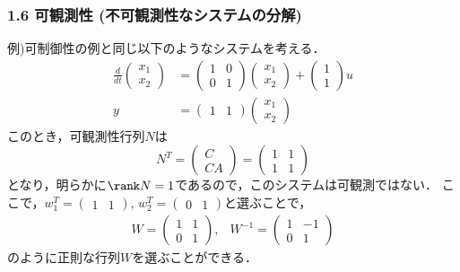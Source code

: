 \begin{frame}[t]
\frametitle{1.6 可観測性 (不可観測性なシステムの分解)}
例)可制御性の例と同じ以下のようなシステムを考える．
\begin{align}
 \frac{d}{dt}
  \left(
   \begin{array}{c}
    x_1 \\
    x_2
   \end{array}
  \right) &=
  \left(
   \begin{array}{cc}
    1 & 0 \\
    0 & 1
   \end{array}
  \right)
  \left(
   \begin{array}{c}
    x_1 \\
    x_2
   \end{array}
  \right) +
  \left(
   \begin{array}{c}
    1 \\
    1
   \end{array}
  \right) u \\
 y &=
  \left(
   \begin{array}{cc}
    1 & 1
   \end{array}
  \right)
  \left(
   \begin{array}{c}
    x_1 \\
    x_2
   \end{array}
  \right)
\end{align}
このとき，可観測性行列$N$は
\begin{equation}
 N^T =
  \left(
   \begin{array}{c}
    C \\
    CA
   \end{array}
  \right) =
  \left(
   \begin{array}{cc}
    1 & 1 \\
    1 & 1
   \end{array}
  \right)
\end{equation}
となり，明らかに$\rank N = 1$であるので，このシステムは可観測ではない．
ここで，$w_1^T = (\begin{array}{cc}1 & 1\end{array})$,
$w_2^T = (\begin{array}{cc}0 & 1\end{array})$と選ぶことで，
\begin{equation}
 \begin{array}{cc}
  W =
   \left(
    \begin{array}{cc}
     1 & 1 \\
     0 & 1
    \end{array}
   \right),
   &
  W^{-1} =
   \left(
    \begin{array}{cc}
     1 & -1 \\
     0 & 1
    \end{array}
   \right)
 \end{array}
\end{equation}
のように正則な行列$W$を選ぶことができる．
\end{frame}


